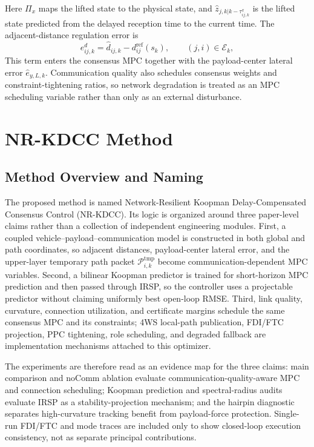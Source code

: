 \documentclass[twocolumn,3p,times,procedia]{elsarticle}
\newcommand{\Method}{NR-KDCC}
\begin{document}
Here $\Pi_x$ maps the lifted state to the physical state, and $\hat z_{j,k|k-\tau^x_{ij,k}}$ is the lifted state predicted from the delayed reception time to the current time. The adjacent-distance regulation error is
\begin{equation}
e^{d}_{ij,k}=\hat d_{ij,k}-d^{\mathrm{ref}}_{ij}(s_k),\qquad (j,i)\in\mathcal E_k ,
\label{eq:adjacent_distance_error}
\end{equation}
This term enters the consensus MPC together with the payload-center lateral error $\hat e_{y,L,k}$. Communication quality also schedules consensus weights and constraint-tightening ratios, so network degradation is treated as an MPC scheduling variable rather than only as an external disturbance.

\section{\Method{} Method}

\subsection{Method Overview and Naming}

The proposed method is named Network-Resilient Koopman Delay-Compensated Consensus Control (\Method{}). Its logic is organized around three paper-level claims rather than a collection of independent engineering modules. First, a coupled vehicle--payload--communication model is constructed in both global and path coordinates, so adjacent distances, payload-center lateral error, and the upper-layer temporary path packet $\mathcal P_{i,k}^{\mathrm{tmp}}$ become communication-dependent MPC variables. Second, a bilinear Koopman predictor is trained for short-horizon MPC prediction and then passed through IRSP, so the controller uses a projectable predictor without claiming uniformly best open-loop RMSE. Third, link quality, curvature, connection utilization, and certificate margins schedule the same consensus MPC and its constraints; 4WS local-path publication, FDI/FTC projection, PPC tightening, role scheduling, and degraded fallback are implementation mechanisms attached to this optimizer.

The experiments are therefore read as an evidence map for the three claims: main comparison and noComm ablation evaluate communication-quality-aware MPC and connection scheduling; Koopman prediction and spectral-radius audits evaluate IRSP as a stability-projection mechanism; and the hairpin diagnostic separates high-curvature tracking benefit from payload-force protection. Single-run FDI/FTC and mode traces are included only to show closed-loop execution consistency, not as separate principal contributions.
\end{document}
